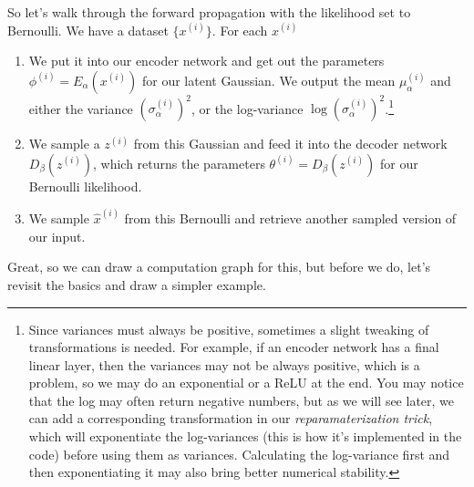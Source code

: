   So let's walk through the forward propagation with the likelihood set to Bernoulli. We have a dataset $\{x^{(i)}\}$. For each $x^{(i)}$
  \begin{enumerate}
    \item We put it into our encoder network and get out the parameters $\phi^{(i)} = E_\alpha (x^{(i)})$ for our latent Gaussian. We output the mean $\mu_\alpha^{(i)}$ and either the variance $(\sigma_{\alpha}^{(i)})^2$, or the log-variance $\log (\sigma_{\alpha}^{(i)})^2$.\footnote{Since variances must always be positive, sometimes a slight tweaking of transformations is needed. For example, if an encoder network has a final linear layer, then the variances may not be always positive, which is a problem, so we may do an exponential or a ReLU at the end. You may notice that the log may often return negative numbers, but as we will see later, we can add a corresponding transformation in our \textit{reparamaterization trick}, which will exponentiate the log-variances (this is how it's implemented in the code) before using them as variances. Calculating the log-variance first and then exponentiating it may also bring better numerical stability.}

    \item We sample a $z^{(i)}$ from this Gaussian and feed it into the decoder network $D_\beta(z^{(i)})$, which returns the parameters $\theta^{(i)} = D_\beta (z^{(i)})$ for our Bernoulli likelihood. 

    \item We sample $\hat{x}^{(i)}$ from this Bernoulli and retrieve another sampled version of our input. 
  \end{enumerate} 

  Great, so we can draw a computation graph for this, but before we do, let's revisit the basics and draw a simpler example. 

